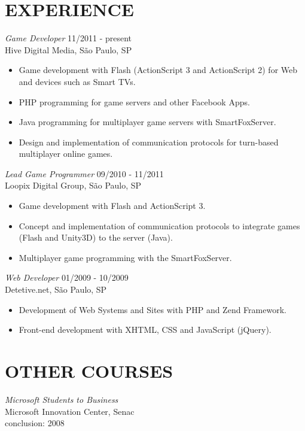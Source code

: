 \documentclass[line,margin]{res}
\begin{document}
\begin{resume}
\section{EXPERIENCE} {\sl Game Developer} \hfill 11/2011 - present \\
                Hive Digital Media, São Paulo, SP
                 \begin{itemize}  \itemsep -3pt
                 \item Game development with Flash (ActionScript 3 and ActionScript 2) for Web and devices such as Smart TVs.
                 \item PHP programming for game servers and other Facebook Apps.
                 \item Java programming for multiplayer game servers with SmartFoxServer.
                 \item Design and implementation of communication protocols for turn-based multiplayer online games.
                 \end{itemize}
                 
                 {\sl Lead Game Programmer} \hfill 09/2010 - 11/2011 \\
                Loopix Digital Group, São Paulo, SP
                 \begin{itemize}  \itemsep -3pt
                 \item Game development with Flash and ActionScript 3.
                 \item Concept and implementation of communication protocols to integrate games (Flash and Unity3D) to the server (Java).
                 \item Multiplayer game programming with the SmartFoxServer.
                 \end{itemize}
 
                {\sl Web Developer} \hfill 01/2009 - 10/2009 \\
                Detetive.net, São Paulo, SP
                 \begin{itemize}  \itemsep -3pt
                 \item Development of Web Systems and Sites with PHP and Zend Framework.
                 \item Front-end development with XHTML, CSS and JavaScript (jQuery).
                 \end{itemize} 

\section{OTHER COURSES}             
           {\sl Microsoft Students to Business} \\
                Microsoft Innovation Center, Senac \\
                conclusion: 2008 



\end{resume}
\end{document}

